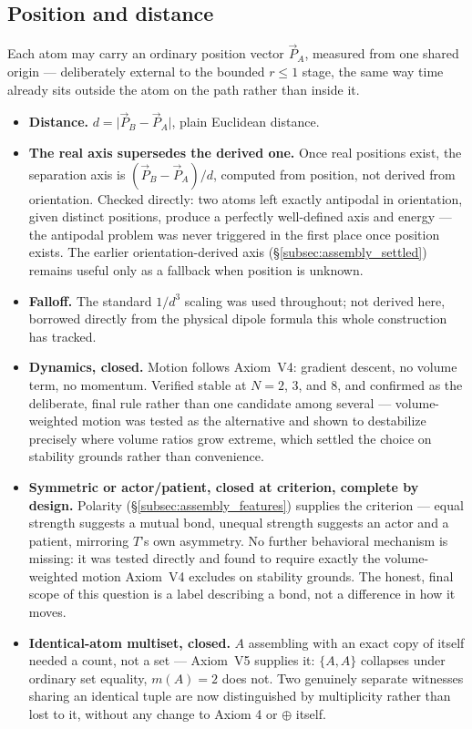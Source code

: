 \documentclass[12pt, a4paper]{article}
\begin{document}
\subsection{Position and distance}
\label{subsec:assembly_position}
Each atom may carry an ordinary position vector $\vec P_A$, measured
from one shared origin --- deliberately external to the bounded
$r\le 1$ stage, the same way time already sits outside the atom on
the path rather than inside it.
\begin{itemize}
\item \textbf{Distance.} $d=\lvert \vec P_B-\vec P_A\rvert$, plain
      Euclidean distance.
\item \textbf{The real axis supersedes the derived one.} Once real
      positions exist, the separation axis is
      $(\vec P_B-\vec P_A)/d$, computed from position, not derived
      from orientation. Checked directly: two atoms left exactly
      antipodal in orientation, given distinct positions, produce a
      perfectly well-defined axis and energy --- the antipodal
      problem was never triggered in the first place once position
      exists. The earlier orientation-derived axis
      (\S\ref{subsec:assembly_settled}) remains useful only as a
      fallback when position is unknown.
\item \textbf{Falloff.} The standard $1/d^3$ scaling was used
      throughout; not derived here, borrowed directly from the
      physical dipole formula this whole construction has tracked.
\item \textbf{Dynamics, closed.} Motion follows Axiom~V4: gradient
      descent, no volume term, no momentum. Verified stable at
      $N=2$, $3$, and $8$, and confirmed as the deliberate, final
      rule rather than one candidate among several --- volume-
      weighted motion was tested as the alternative and shown to
      destabilize precisely where volume ratios grow extreme, which
      settled the choice on stability grounds rather than
      convenience.
\item \textbf{Symmetric or actor/patient, closed at criterion,
      complete by design.} Polarity (\S\ref{subsec:assembly_features})
      supplies the criterion --- equal strength suggests a mutual
      bond, unequal strength suggests an actor and a patient,
      mirroring $T$'s own asymmetry. No further behavioral mechanism
      is missing: it was tested directly and found to require
      exactly the volume-weighted motion Axiom~V4 excludes on
      stability grounds. The honest, final scope of this question is
      a label describing a bond, not a difference in how it moves.
\item \textbf{Identical-atom multiset, closed.} $A$ assembling with
      an exact copy of itself needed a count, not a set --- Axiom~V5
      supplies it: $\{A,A\}$ collapses under ordinary set equality,
      $m(A)=2$ does not. Two genuinely separate witnesses sharing an
      identical tuple are now distinguished by multiplicity rather
      than lost to it, without any change to Axiom 4 or $\oplus$
      itself.
\end{itemize}
\end{document}
